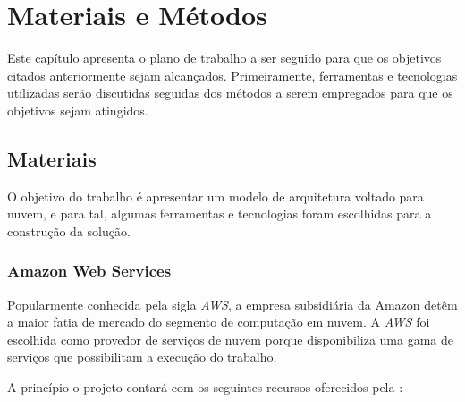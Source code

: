 
\chapter{Materiais e Métodos}\label{cap:materialemetodos}


Este capítulo apresenta o plano de trabalho a ser seguido para que os objetivos citados
anteriormente sejam alcançados. Primeiramente, ferramentas e tecnologias utilizadas serão discutidas seguidas dos métodos a serem empregados para que os objetivos sejam atingidos.

\section{Materiais}\label{sec:materiais}

O objetivo do trabalho é apresentar um modelo de arquitetura voltado para nuvem, e para tal, algumas ferramentas e tecnologias foram escolhidas para a construção da solução.

\subsection{Amazon Web Services}\label{subsec:amazonWebServices}

Popularmente conhecida pela sigla \textit{AWS}, a empresa subsidiária da Amazon detêm a maior fatia de mercado do segmento de computação em nuvem. A \textit{AWS} foi escolhida como provedor de serviços de nuvem porque disponibiliza uma gama de serviços que possibilitam a execução do trabalho.

A princípio o projeto contará com os seguintes recursos oferecidos pela \citet{awsconceitosbasicos}: 

